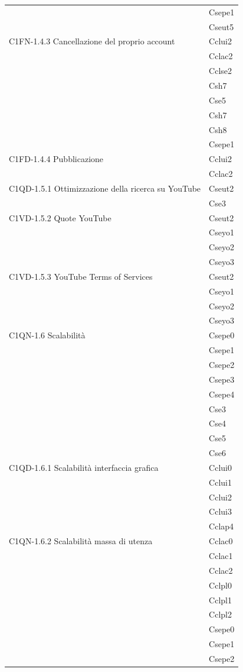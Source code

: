 \begin{footnotesize}
\begin{longtable}[!h]{|l|l|}
& Csepe1\\
& Cseut5\\\hline  
C1FN-1.4.3 Cancellazione del proprio account & Cclui2\\
& Cclac2\\
& Cclse2\\
& Csh7\\
& Cse5\\
& Csh7\\
& Csh8\\
& Csepe1\\\hline  
C1FD-1.4.4 Pubblicazione & Cclui2\\
& Cclac2\\\hline 
C1QD-1.5.1 Ottimizzazione della ricerca su YouTube & Cseut2\\
& Cse3\\\hline 
C1VD-1.5.2 Quote YouTube & Cseut2\\
& Cseyo1\\
& Cseyo2\\
& Cseyo3\\\hline 
C1VD-1.5.3 YouTube Terms of Services & Cseut2\\
& Cseyo1\\
& Cseyo2\\
& Cseyo3\\\hline  
C1QN-1.6 Scalabilit\`a & Csepe0\\
& Csepe1\\
& Csepe2\\
& Csepe3\\
& Csepe4\\
& Cse3\\
& Cse4\\
& Cse5\\
& Cse6\\\hline   
C1QD-1.6.1 Scalabilit\`a interfaccia grafica  & Cclui0\\ 
& Cclui1\\
& Cclui2\\
& Cclui3\\
& Cclap4\\\hline 
C1QN-1.6.2 Scalabilit\`a massa di utenza & Cclac0\\
& Cclac1\\
& Cclac2\\
& Cclpl0\\
& Cclpl1\\
& Cclpl2\\
& Csepe0\\
& Csepe1\\
& Csepe2\\

\end{longtable}
\end{footnotesize}
